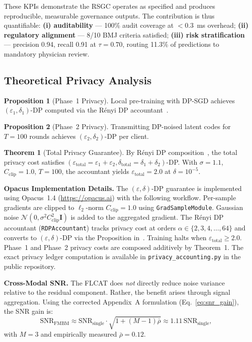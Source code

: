 \documentclass{ieeeaccess}
\begin{document}
These KPIs demonstrate the RSGC operates as specified and produces
reproducible, measurable governance outputs. The contribution is thus
quantifiable: \textbf{(i) auditability} --- 100\% audit coverage at
$<$0.3~ms overhead; \textbf{(ii) regulatory alignment} --- 8/10 BMJ
criteria satisfied; \textbf{(iii) risk stratification} --- precision 0.94,
recall 0.91 at $\tau\!=\!0.70$, routing 11.3\% of predictions to
mandatory physician review.

\subsection{Theoretical Privacy Analysis}

\label{subsec:privacy_theory}
\textbf{Proposition 1} (Phase~1 Privacy). Local pre-training with DP-SGD
achieves $(\varepsilon_1, \delta_1)$-DP computed via the R\'{e}nyi DP
accountant~\cite{mironov2017renyi}.

\textbf{Proposition 2} (Phase~2 Privacy). Transmitting DP-noised latent
codes for $T\!=\!100$ rounds achieves $(\varepsilon_2,\delta_2)$-DP
per client.

\textbf{Theorem 1} (Total Privacy Guarantee). By R\'{e}nyi DP
composition~\cite{mironov2017renyi}, the total privacy cost satisfies
$(\varepsilon_{\mathrm{total}}\!=\!\varepsilon_1+\varepsilon_2,
\delta_{\mathrm{total}}\!=\!\delta_1+\delta_2)$-DP. With $\sigma\!=\!1.1$,
$C_{\mathrm{clip}}\!=\!1.0$, $T\!=\!100$, the accountant yields
$\varepsilon_{\mathrm{total}}\!=\!2.0$ at $\delta\!=\!10^{-5}$.

\textbf{Opacus Implementation Details.}
The $(\varepsilon,\delta)$-DP guarantee is implemented using Opacus~1.4
(\url{https://opacus.ai}) with the following workflow. Per-sample gradients
are clipped to $\ell_2$-norm $C_{\mathrm{clip}}\!=\!1.0$ using
\texttt{GradSampleModule}. Gaussian noise $\mathcal{N}(0,
\sigma^2 C_{\mathrm{clip}}^2\mathbf{I})$ is added to the aggregated gradient.
The R\'{e}nyi DP accountant (\texttt{RDPAccountant}) tracks privacy cost
at orders $\alpha\!\in\!\{2,3,4,\ldots,64\}$ and converts to
$(\varepsilon,\delta)$-DP via the Proposition in~\cite{mironov2017renyi}.
Training halts when $\varepsilon_{\mathrm{total}}\!\geq\!2.0$.
Phase~1 and Phase~2 privacy costs are composed additively by
Theorem~1. The exact privacy ledger computation is available in
\texttt{privacy\_accounting.py} in the public repository.

\textbf{Cross-Modal SNR.} The FLCAT does \emph{not} directly reduce noise
variance relative to the residual component. Rather, the benefit arises
through signal aggregation. Using the corrected Appendix~A formulation
(Eq.~\ref{eq:snr_gain}), the SNR gain is:
\begin{equation}
\mathrm{SNR}_{\mathrm{FMBM}} \approx
\mathrm{SNR}_{\mathrm{single}} \cdot \sqrt{1 + (M-1)\bar\rho}
\approx 1.11\,\mathrm{SNR}_{\mathrm{single}},
\label{eq:snr_gain}
\end{equation}
with $M\!=\!3$ and empirically measured $\bar\rho\!=\!0.12$.
\end{document}
